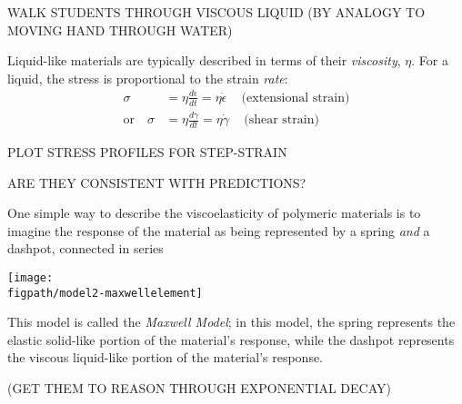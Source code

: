 \begin{activity}
\begin{ctqs}
	\question  WALK STUDENTS THROUGH VISCOUS LIQUID (BY ANALOGY TO MOVING HAND THROUGH WATER)
	
\end{ctqs}

\begin{infobox}
	
	Liquid-like materials are typically described in terms of their \emph{viscosity}, $\eta$.  For a liquid, the stress is proportional to the strain \emph{rate}:
	\begin{align*}
		\sigma &= \eta\frac{d\epsilon}{dt}=\eta\dot\epsilon\,\,\,\,\,\,\,\text{(extensional strain)}\\
		\text{or}\,\,\,\,\,\,\sigma &= \eta\frac{d\gamma}{dt}=\eta\dot\gamma\,\,\,\,\,\,\,\text{(shear strain)}
	\end{align*}

\end{infobox}

\begin{ctqs}
	\question PLOT STRESS PROFILES FOR STEP-STRAIN
	
	\question ARE THEY CONSISTENT WITH PREDICTIONS?
\end{ctqs}
	

\begin{model}
\label{\labelbase:mdl:maxwell}

	One simple way to describe the viscoelasticity of polymeric materials is to imagine the response of the material as being represented by a spring \emph{and} a dashpot, connected in series
	
	\centerline{\texttt{[image: \\figpath/model2-maxwellelement]}}
	
	This model is called the \emph{Maxwell Model}; in this model, the spring represents the elastic solid-like portion of the material's response, while the dashpot represents the viscous liquid-like portion of the material's response.
	
\end{model}

	
\begin{ctqs}
	\question (GET THEM TO REASON THROUGH EXPONENTIAL DECAY)
	
					\begin{solution}[2.5in]
					\end{solution}
					
\end{ctqs}


\end{activity}
